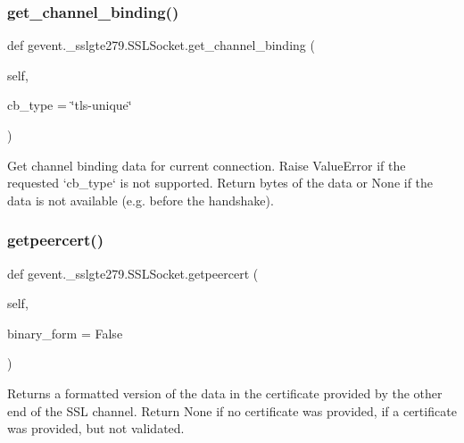 \subsubsection{\texorpdfstring{get\+\_\+channel\+\_\+binding()}{get\_channel\_binding()}}
{\footnotesize\ttfamily def gevent.\+\_\+sslgte279.\+S\+S\+L\+Socket.\+get\+\_\+channel\+\_\+binding (\begin{DoxyParamCaption}\item[{}]{self,  }\item[{}]{cb\+\_\+type = {\ttfamily \char`\"{}tls-\/unique\char`\"{}} }\end{DoxyParamCaption})}

\begin{DoxyVerb}Get channel binding data for current connection.  Raise ValueError
if the requested `cb_type` is not supported.  Return bytes of the data
or None if the data is not available (e.g. before the handshake).
\end{DoxyVerb}
 \mbox{\label{classgevent_1_1__sslgte279_1_1_s_s_l_socket_ae78b9eb036c889ab8ea89a3fb49362ad}} 
\subsubsection{\texorpdfstring{getpeercert()}{getpeercert()}}
{\footnotesize\ttfamily def gevent.\+\_\+sslgte279.\+S\+S\+L\+Socket.\+getpeercert (\begin{DoxyParamCaption}\item[{}]{self,  }\item[{}]{binary\+\_\+form = {\ttfamily False} }\end{DoxyParamCaption})}

\begin{DoxyVerb}Returns a formatted version of the data in the
certificate provided by the other end of the SSL channel.
Return None if no certificate was provided, {} if a
certificate was provided, but not validated.\end{DoxyVerb}
 \mbox{\label{classgevent_1_1__sslgte279_1_1_s_s_l_socket_af55392ea328da9666f5ed8841db988fb}} 
